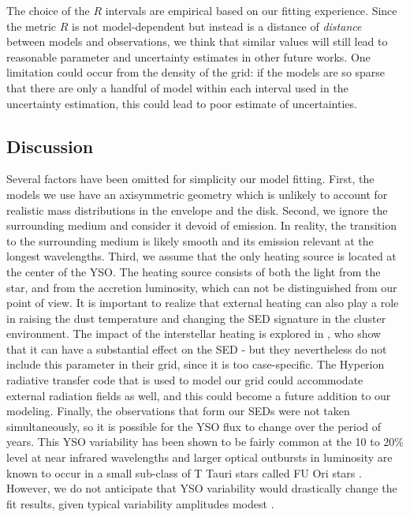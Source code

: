The choice of the $R$ intervals are empirical based on our fitting experience. Since the metric $R$ is not model-dependent but instead is a distance of \textit{distance} between models and observations, we think that similar values will still lead to reasonable parameter and uncertainty estimates in other future works. One limitation could occur from the density of the grid: if the models are so sparse that there are only a handful of model within each interval used in the uncertainty estimation, this could lead to poor estimate of uncertainties. 






\subsection{Discussion}

Several factors have been omitted for simplicity our model fitting. First, the models we use have an axisymmetric geometry which is unlikely to account for realistic mass distributions in the envelope and the disk. Second, we ignore the surrounding medium and consider it devoid of emission. In reality, the transition to the surrounding medium is likely smooth and its emission relevant at the longest wavelengths. Third, we assume that the only heating source is located at the center of the YSO. The heating source consists of both the light from the star, and from the accretion luminosity, which can not be distinguished from our point of view. It is important to realize that external heating can also play a role in raising the dust temperature and changing the SED signature in the cluster environment. The impact of the interstellar heating is explored in \citet{Furlan:2016df}, who show that it can have a substantial effect on the SED - but they nevertheless do not include this parameter in their grid, since it is too case-specific. The Hyperion radiative transfer code that is used to model our grid could accommodate external radiation fields as well, and this could become a future addition to our modeling. Finally, the observations that form our SEDs were not taken simultaneously, so it is possible for the YSO flux to change over the period of years. This YSO variability has been shown to be fairly common at the
10 to 20\% level at near infrared wavelengths \citep{Rebull:2014iw} and larger optical outbursts in luminosity are known to occur in a small sub-class of T Tauri stars called FU Ori stars \citep{Hartmann:1996gd}. However, we do not anticipate that YSO variability would drastically change the fit results, given typical variability amplitudes modest \citep[e.g.][]{Poppenhaeger:2015hm}.

